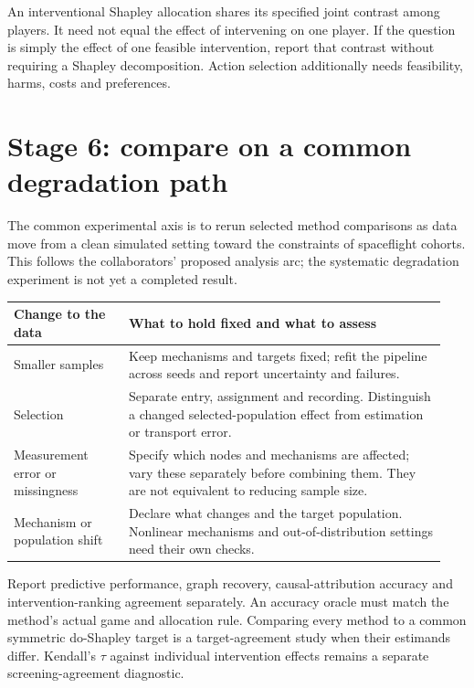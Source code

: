 \documentclass[11pt,letterpaper]{article}
\begin{document}
An interventional Shapley allocation shares its specified joint contrast among players. It need not equal the effect of intervening on one player. If the question is simply the effect of one feasible intervention, report that contrast without requiring a Shapley decomposition. Action selection additionally needs feasibility, harms, costs and preferences.

\clearpage
\section*{Stage 6: compare on a common degradation path}

The common experimental axis is to rerun selected method comparisons as data move from a clean simulated setting toward the constraints of spaceflight cohorts. This follows the collaborators' proposed analysis arc; the systematic degradation experiment is not yet a completed result.

\begingroup\small\setlength{\tabcolsep}{5pt}
\begin{longtable}{@{}L{0.25\linewidth}L{0.69\linewidth}@{}}
\toprule Change to the data & What to hold fixed and what to assess\\\midrule\endhead
Smaller samples & Keep mechanisms and targets fixed; refit the pipeline across seeds and report uncertainty and failures.\\[4pt]
Selection & Separate entry, assignment and recording. Distinguish a changed selected-population effect from estimation or transport error.\\[4pt]
Measurement error or missingness & Specify which nodes and mechanisms are affected; vary these separately before combining them. They are not equivalent to reducing sample size.\\[4pt]
Mechanism or population shift & Declare what changes and the target population. Nonlinear mechanisms and out-of-distribution settings need their own checks.\\
\bottomrule
\end{longtable}\endgroup

Report predictive performance, graph recovery, causal-attribution accuracy and intervention-ranking agreement separately. An accuracy oracle must match the method's actual game and allocation rule. Comparing every method to a common symmetric do-Shapley target is a target-agreement study when their estimands differ. Kendall's $\tau$ against individual intervention effects remains a separate screening-agreement diagnostic.
\end{document}

